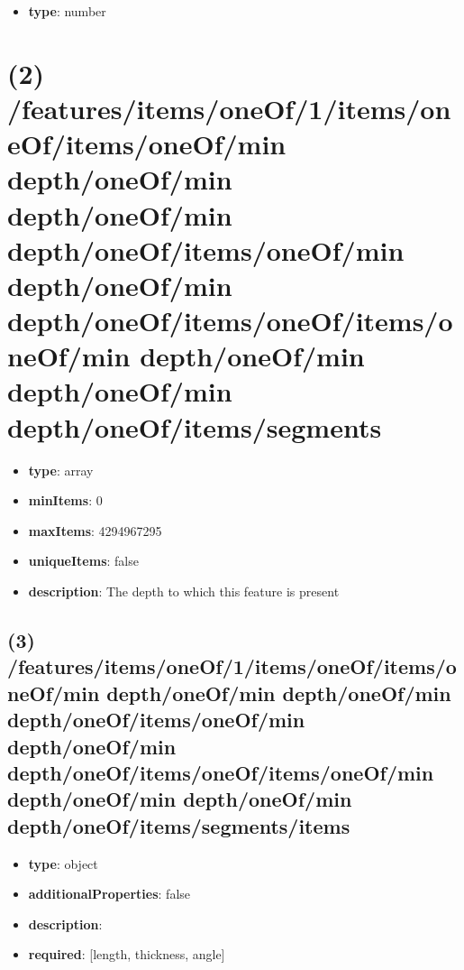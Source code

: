 \begin{itemize}[leftmargin=3em]\item {\bf type}: number
\end{itemize}\section{(2) /features/items/oneOf/1/items/oneOf/items/oneOf/min depth/oneOf/min depth/oneOf/min depth/oneOf/items/oneOf/min depth/oneOf/min depth/oneOf/items/oneOf/items/oneOf/min depth/oneOf/min depth/oneOf/min depth/oneOf/items/segments}
\begin{itemize}[leftmargin=2em]\item {\bf type}: array
\item {\bf minItems}: 0
\item {\bf maxItems}: 4294967295
\item {\bf uniqueItems}: false
\item {\bf description}: The depth to which this feature is present
\end{itemize}\subsection{(3) /features/items/oneOf/1/items/oneOf/items/oneOf/min depth/oneOf/min depth/oneOf/min depth/oneOf/items/oneOf/min depth/oneOf/min depth/oneOf/items/oneOf/items/oneOf/min depth/oneOf/min depth/oneOf/min depth/oneOf/items/segments/items}
\begin{itemize}[leftmargin=3em]\item {\bf type}: object
\item {\bf additionalProperties}: false
\item {\bf description}: 
\item {\bf required}: [length, thickness, angle]\end{itemize}
